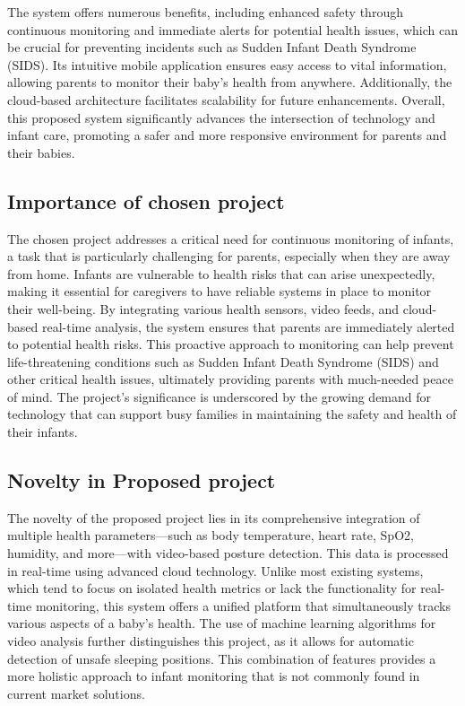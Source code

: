 \documentclass[12pt,a4paper]{report}
\begin{document}
The system offers numerous benefits, including enhanced safety through continuous monitoring and immediate alerts for potential health issues, which can be crucial for preventing incidents such as Sudden Infant Death Syndrome (SIDS). Its intuitive mobile application ensures easy access to vital information, allowing parents to monitor their baby’s health from anywhere. Additionally, the cloud-based architecture facilitates scalability for future enhancements. Overall, this proposed system significantly advances the intersection of technology and infant care, promoting a safer and more responsive environment for parents and their babies.

\subsection{Importance of chosen project}
The chosen project addresses a critical need for continuous monitoring of infants, a task that is particularly challenging for parents, especially when they are away from home. Infants are vulnerable to health risks that can arise unexpectedly, making it essential for caregivers to have reliable systems in place to monitor their well-being. By integrating various health sensors, video feeds, and cloud-based real-time analysis, the system ensures that parents are immediately alerted to potential health risks. This proactive approach to monitoring can help prevent life-threatening conditions such as Sudden Infant Death Syndrome (SIDS) and other critical health issues, ultimately providing parents with much-needed peace of mind. The project's significance is underscored by the growing demand for technology that can support busy families in maintaining the safety and health of their infants.
\subsection{Novelty in Proposed project}
The novelty of the proposed project lies in its comprehensive integration of multiple health parameters—such as body temperature, heart rate, SpO2, humidity, and more—with video-based posture detection. This data is processed in real-time using advanced cloud technology. Unlike most existing systems, which tend to focus on isolated health metrics or lack the functionality for real-time monitoring, this system offers a unified platform that simultaneously tracks various aspects of a baby’s health. The use of machine learning algorithms for video analysis further distinguishes this project, as it allows for automatic detection of unsafe sleeping positions. This combination of features provides a more holistic approach to infant monitoring that is not commonly found in current market solutions.
\end{document}
